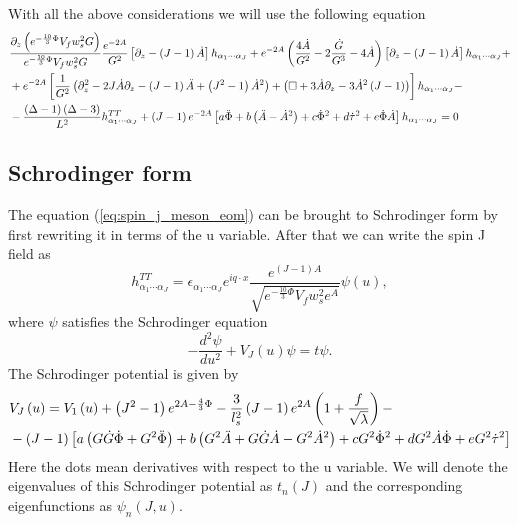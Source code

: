 \documentclass[10 pt]{article}
\begin{document}
With all the above considerations we will use the following equation
\begin{align}
&\frac{\partial_z \left(e^{-\frac{10}{3}\Phi} V_f w_s^2 G\right)}{e^{-\frac{10}{3}\Phi} V_f w_s^2 G} \frac{e^{-2A}}{G^2} \left[\partial_z - \left(J-1\right) \dot{A} \right]h_{\alpha_1 \cdots \alpha_J} + e^{-2A}\left( \frac{4 \dot{A}}{G^2} - 2 \frac{\dot{G}}{G^3} - 4 \dot{A} \right) \left[\partial_z - \left(J-1\right) \dot{A} \right]h_{\alpha_1  \cdots \alpha_J} + \notag \\
&+e^{-2A} \left[\frac{1}{G^2}\left(\partial_z^2 - 2 J \dot{A} \partial_z - \left(J-1\right) \ddot{A} + \left(J^2-1\right) {\dot{A}}^2 \right)+ \left( \Box + 3\dot{A} \partial_z - 3 {\dot{A}}^2 \left(J-1\right) \right)  \right]h_{\alpha_1 \cdots \alpha_J} - \notag \\
& - \frac{\left(\Delta - 1 \right)\left(\Delta - 3\right)}{L^2} h_{\alpha_1 \cdots \alpha_J}^{TT} + \left(J-1\right) e^{-2A} \left[ a \ddot{\Phi} + b \left(\ddot{A} - {\dot{A}}^2\right) + c {\dot{\Phi}}^2 + d {\dot{\tau}}^2 + e \dot{\Phi} \dot{A} \right] h_{\alpha_1 \cdots \alpha_J} = 0
\label{eq:spin_j_meson_eom}
\end{align}

\subsection{Schrodinger form}
The equation (\ref{eq:spin_j_meson_eom}) can be brought to Schrodinger form by first rewriting it in terms of the u variable. After that we can write the spin J field as
\begin{equation}
h^{TT}_{\alpha_1 \cdots \alpha_J} = \epsilon_{\alpha_1 \cdots \alpha_J} e^{i q \cdot x} \frac{e^{\left(J-1\right)A}}{\sqrt{e^{-\frac{10}{3}\Phi}V_f w_s^2 e^A}} \psi\left(u\right),
\end{equation}
where $\psi$ satisfies the Schrodinger equation
\begin{equation}
- \frac{d^2 \psi}{du^2} + V_J \left(u\right) \psi = t \psi.
\end{equation}
The Schrodinger potential is given by
\begin{align}
&V_J\left(u\right) = V_1\left(u\right) + \left(J^2 - 1\right) e^{2 A - \frac{4}{3} \Phi} - \frac{3}{l_s^2} \left(J-1\right) e^{2A} \left(1 + \frac{f}{\sqrt{\lambda}}\right) - \notag \\
& - \left(J-1\right) \left[a \left( G \dot{G} \dot{\Phi} + G^2 \ddot{\Phi} \right) + b \left( G^2 \ddot{A} + G \dot{G} \dot{A} -G^2 \dot{A}^2\right) +c G^2 \dot{\Phi}^2 + d G^2 \dot{A}\dot{\Phi} + e G^2 \dot{\tau}^2 \right]
\label{eq:meson_schrodinger_potential}
\end{align}
Here the dots mean derivatives with respect to the u variable.
We will denote the eigenvalues of this Schrodinger potential as $t_n\left(J\right)$ and the corresponding eigenfunctions as $\psi_n\left(J, u\right)$.
\end{document}
